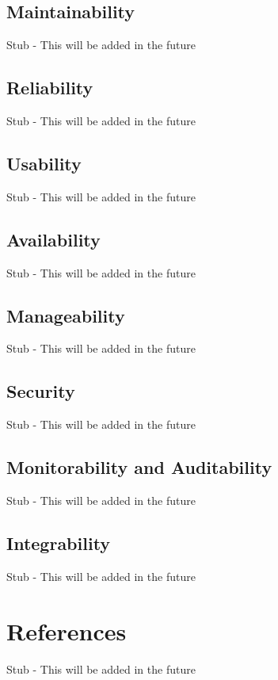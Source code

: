 \documentclass[12pt]{article}
\begin{document}
\subsection{Maintainability}
Stub - This will be added in the future
\subsection{Reliability}
Stub - This will be added in the future
\subsection{Usability}
Stub - This will be added in the future
\subsection{Availability}
Stub - This will be added in the future
\subsection{Manageability}
Stub - This will be added in the future
\subsection{Security}
Stub - This will be added in the future
\subsection{Monitorability and Auditability}
Stub - This will be added in the future
\subsection{Integrability}
Stub - This will be added in the future

\section{References}
Stub - This will be added in the future
\end{document}
